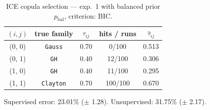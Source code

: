 \begin{table}[htbp]
  \centering
  \caption{ICE copula selection — exp.\ 1 with balanced prior $p_{\text{bal}}$, criterion: BIC.}
  \label{tab:exp3-exp1_bal_p__bic}
  \begin{tabular}{ccccc}
    \toprule
    $(i, j)$ & true family & $\tau_{ij}$ & hits / runs & $\hat\tau_{ij}$ \\
    \midrule
    (0, 0) & \texttt{Gauss} & 0.70 & 0/100 & 0.513 \\
    (0, 1) & \texttt{GH} & 0.40 & 12/100 & 0.306 \\
    (1, 0) & \texttt{GH} & 0.40 & 11/100 & 0.295 \\
    (1, 1) & \texttt{Clayton} & 0.70 & 100/100 & 0.670 \\
    \bottomrule
  \end{tabular}
  \par\smallskip Supervised error: 23.01\% ($\pm$ 1.28). Unsupervised: 31.75\% ($\pm$ 2.17).
\end{table}
